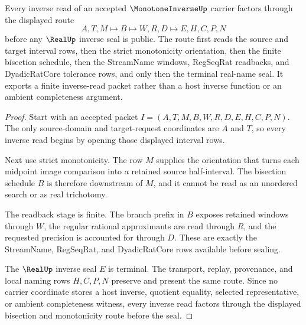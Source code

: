 \begin{theorem}
\label{thm:monotone-inverse-bisection-handoff}
Every inverse read of an accepted $\MonotoneInverseUp$ carrier factors through the displayed route
$$
A,T,M \longmapsto B \longmapsto W,R,D \longmapsto E,H,C,P,N
$$
before any $\RealUp$ inverse seal is public. The route first reads the source and target interval rows, then the strict monotonicity orientation, then the finite bisection schedule, then the StreamName windows, RegSeqRat readbacks, and DyadicRatCore tolerance rows, and only then the terminal real-name seal. It exports a finite inverse-read packet rather than a host inverse function or an ambient completeness argument.
\end{theorem}
\begin{proof}
Start with an accepted packet $I=(A,T,M,B,W,R,D,E,H,C,P,N)$. The only source-domain and target-request coordinates are $A$ and $T$, so every inverse read begins by opening those displayed interval rows.

Next use strict monotonicity. The row $M$ supplies the orientation that turns each midpoint image comparison into a retained source half-interval. The bisection schedule $B$ is therefore downstream of $M$, and it cannot be read as an unordered search or as real trichotomy.

The readback stage is finite. The branch prefix in $B$ exposes retained windows through $W$, the regular rational approximants are read through $R$, and the requested precision is accounted for through $D$. These are exactly the StreamName, RegSeqRat, and DyadicRatCore rows available before sealing.

The $\RealUp$ inverse seal $E$ is terminal. The transport, replay, provenance, and local naming rows $H,C,P,N$ preserve and present the same route. Since no carrier coordinate stores a host inverse, quotient equality, selected representative, or ambient completeness witness, every inverse read factors through the displayed bisection and monotonicity route before the seal.
\end{proof}


